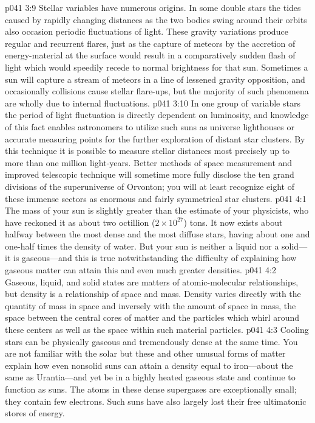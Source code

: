 \vs p041 3:9 Stellar variables have numerous origins. In some double stars the tides caused by rapidly changing distances as the two bodies swing around their orbits also occasion periodic fluctuations of light. These gravity variations produce regular and recurrent flares, just as the capture of meteors by the accretion of energy\hyp{}material at the surface would result in a comparatively sudden flash of light which would speedily recede to normal brightness for that sun. Sometimes a sun will capture a stream of meteors in a line of lessened gravity opposition, and occasionally collisions cause stellar flare\hyp{}ups, but the majority of such phenomena are wholly due to internal fluctuations.
\vs p041 3:10 In one group of variable stars the period of light fluctuation is directly dependent on luminosity, and knowledge of this fact enables astronomers to utilize such suns as universe lighthouses or accurate measuring points for the further exploration of distant star clusters. By this technique it is possible to measure stellar distances most precisely up to more than one million light\hyp{}years. Better methods of space measurement and improved telescopic technique will sometime more fully disclose the ten grand divisions of the superuniverse of Orvonton; you will at least recognize eight of these immense sectors as enormous and fairly symmetrical star clusters.\plusone
{}
\vs p041 4:1 The mass of your sun is slightly greater than the estimate of your physicists, who have reckoned it as about two octillion ($2\times 10^{27}$) tons. It now exists about halfway between the most dense and the most diffuse stars, having about one and one\hyp{}half times the density of water. But your sun is neither a liquid nor a solid---it is gaseous---and this is true notwithstanding the difficulty of explaining how gaseous matter can attain this and even much greater densities.
\pc \vs p041 4:2 Gaseous, liquid, and solid states are matters of atomic\hyp{}molecular relationships, but density is a relationship of space and mass. Density varies directly with the quantity of mass in space and inversely with the amount of space in mass, the space between the central cores of matter and the particles which whirl around these centers as well as the space within such material particles.
\pc \vs p041 4:3 Cooling stars can be physically gaseous and tremendously dense at the same time. You are not familiar with the solar  but these and other unusual forms of matter explain how even nonsolid suns can attain a density equal to iron---about the same as Urantia---and yet be in a highly heated gaseous state and continue to function as suns. The atoms in these dense supergases are exceptionally small; they contain few electrons. Such suns have also largely lost their free ultimatonic stores of energy.

